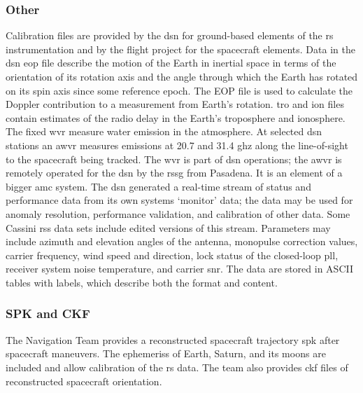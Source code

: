 \documentclass{article}
\begin{document}
            \subsubsection{\footnotesize{Other}}
                Calibration files are provided by the \gls{dsn}
                for ground-based elements of the \gls{rs}
                instrumentation and by the flight project for
                the spacecraft elements. Data in the \gls{dsn}
                \gls{eop} file describe the motion of the Earth
                in inertial space in terms of the orientation of
                its rotation axis and the angle through which the
                Earth has rotated on its spin axis since some
                reference epoch. The EOP file is used to calculate
                the Doppler contribution to a measurement from
                Earth's rotation. \gls{tro} and \gls{ion} files
                contain estimates of the radio delay in the
                Earth's troposphere and ionosphere. The fixed
                \gls{wvr} measure water emission in the
                atmosphere. At selected \gls{dsn} stations
                an \gls{awvr} measures emissions
                at 20.7 and 31.4 \gls{ghz} along the
                line-of-sight to the spacecraft being tracked.
                The \gls{wvr} is part of \gls{dsn} operations;
                the \gls{awvr} is remotely operated for the
                \gls{dsn} by the \gls{rssg} from Pasadena.
                It is an element of a bigger \gls{amc} system.
                The \gls{dsn} generated a real-time stream of
                status and performance data from its own
                systems `monitor’ data; the data may be used
                for anomaly resolution, performance validation,
                and calibration of other data. Some Cassini
                \gls{rss} data sets include edited versions of
                this stream. Parameters may include \gls{azimuth}
                and \gls{elevation} angles of the antenna,
                \gls{monopulse} correction values, \gls{carrier}
                \gls{frequency}, wind speed and direction,
                lock status of the \gls{closed-loop} \gls{pll},
                receiver system noise temperature,
                and \gls{carrier} \gls{snr}. The data are stored
                in ASCII tables with labels, which describe both
                the format and content.
            \subsubsection{\footnotesize SPK and CKF}
                The Navigation Team provides a reconstructed
                spacecraft trajectory \gls{spk} after spacecraft
                maneuvers. The \glspl{ephemeris} of Earth, Saturn,
                and its moons are included and allow
                 calibration of
                the \gls{rs} data. The team also provides
                \gls{ckf} files of reconstructed spacecraft
                orientation. 
\end{document}
